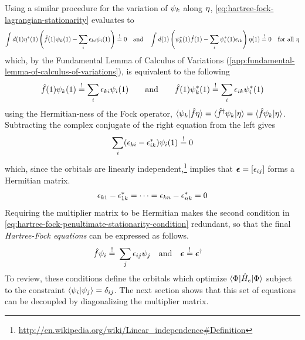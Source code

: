 \documentclass[11pt]{article}
\numberwithin{equation}{section}
\begin{document}
Using a similar procedure for the variation of $\psi _k$ along $\eta $, \cref{eq:hartree-fock-lagrangian-stationarity} evaluates to
\begin{align*}
  \int
  d(1)
  \eta^*(1)
  \left(
    \hat{f}(1)\psi _k(1)
  -
    \sum_i
    \epsilon _{ki}
    \psi _i(1)
  \right)
\overset{!}=0
\hspace{10pt}
  \text{and}
\hspace{10pt}
  \int
  d(1)
  \left(
    \psi _k^*(1)
    \hat{f}(1)
  -
    \sum_i
    \psi _i^*(1)
    \epsilon _{ik}
  \right)
  \eta(1)
\overset{!}=0
\hspace{10pt}
  \text{for all $\eta $}
\end{align*}
which, by the Fundamental Lemma of Calculus of Variations (\cref{app:fundamental-lemma-of-calculus-of-variations}), is equivalent to the following
\begin{align}\label{eq:hartree-fock-penultimate-stationarity-condition}
  \hat{f}(1)
  \psi _k(1)
\overset{!}{=}
  \sum_i
  \epsilon _{ki}
  \psi _i(1)
\hspace{20pt}
  \text{and}
\hspace{20pt}
  \hat{f}(1)
  \psi _k^*(1)
\overset{!}{=}
  \sum_i
  \epsilon _{ik}
  \psi _i^*(1)
\end{align}
using the Hermitian-ness of the Fock operator, $\langle\psi _k|\hat{f}\eta\rangle=\langle\hat{f}^\dagger\psi _k|\eta\rangle=\langle\hat{f}\psi _k|\eta\rangle$.
Subtracting the complex conjugate of the right equation from the left gives
\begin{align*}
  \sum_i
  (\epsilon _{ki}-\epsilon _{ik}^*)\psi _i(1)
\overset{!}=
  0
\end{align*}
which, since the orbitals are linearly independent,\footnote{\url{http://en.wikipedia.org/wiki/Linear_independence\#Definition}}
implies that $\bm{\ev}=[\ev_{ij}]$ forms a Hermitian matrix.
\begin{align}
  \epsilon _{k1}-\epsilon _{1k}^*=\cdots=\epsilon _{kn}-\epsilon _{nk}^*=0
\end{align}
Requiring the multiplier matrix to be Hermitian makes the second condition in \cref{eq:hartree-fock-penultimate-stationarity-condition} redundant, so that the final \textit{Hartree-Fock equations} can be expressed as follows.
\begin{align}\label{eq:hartree-fock-noncanonical-stationarity-condition}
  \op{f}\y_i
\overset{!}=&\
  \sum_j
  \ev_{ij}
  \y_j
\hspace{10pt}
  \text{and}
\hspace{10pt}
  \bm{\ev}
\overset{!}=
  \bm{\ev}\dg
\end{align}
To review, these conditions define the orbitals which optimize $\langle\Phi |\hat{H}_e|\Phi \rangle$ subject to the constraint $\langle\psi _i|\psi _j\rangle=\delta _{ij}$.
The next section shows that this set of equations can be decoupled by diagonalizing the multiplier matrix.
\end{document}
